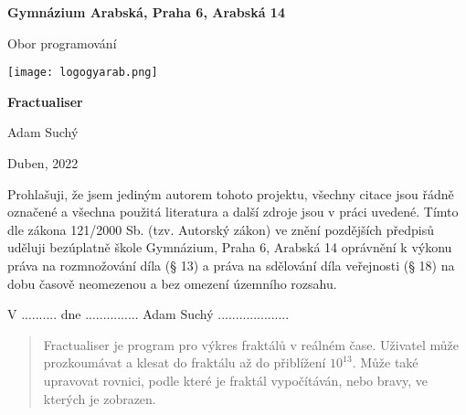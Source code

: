 
\begin{titlepage}
\begin{center}
\large \vspace*{\fill}
\thispagestyle{empty}

\LARGE

{ \huge \textbf{Gymnázium Arabská, Praha 6, Arabská 14}}

{\LARGE Obor programování }

\vfill
\texttt{[image: logogyarab.png]}
\vspace{15pt}

\vfill

{\huge \textbf{Fractualiser}}

\vfill

Adam Suchý

\vfill

{\large Duben, 2022}

\vspace*{\fill}
\end{center}
\end{titlepage}

\thispagestyle{empty}
\addtocounter{page}{-1}
\vspace*{\fill}
Prohlašuji, že jsem jediným autorem tohoto projektu, všechny citace jsou řádně označené a všechna 
použitá literatura a další zdroje jsou v práci uvedené. Tímto dle zákona 121/2000 Sb. (tzv. Autorský zákon) 
ve znění pozdějších předpisů uděluji bezúplatně škole Gymnázium, Praha 6, Arabská 14 oprávnění k výkonu 
práva na rozmnožování díla (§ 13) a práva na sdělování díla veřejnosti (§ 18) na dobu časově neomezenou a 
bez omezení územního rozsahu.
\bigskip

V .......... dne ............... \hspace{4cm} Adam Suchý ....................
\vspace{2cm}

\newpage
\begin{abstract}
    Fractualiser je program pro výkres fraktálů v reálném čase. Uživatel může prozkoumávat a klesat do fraktálu až
    do přiblížení $10^{13}$. Může také upravovat rovnici, podle které je fraktál vypočítáván, nebo bravy, ve kterých
    je zobrazen.
\end{abstract}

\tableofcontents
